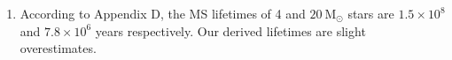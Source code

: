 \documentclass[11pt]{article}
\newcommand\msol{\mathrm{M}_\odot}
\begin{document}
\begin{enumerate}
\begin{enumerate}
    \item According to Appendix D, the MS lifetimes of 4 and $20~\msol$ stars are $1.5 \times 10^8$ and $7.8 \times 10^6$ years respectively. Our derived lifetimes are slight overestimates.
    \end{enumerate}


\end{enumerate}
\end{document}
